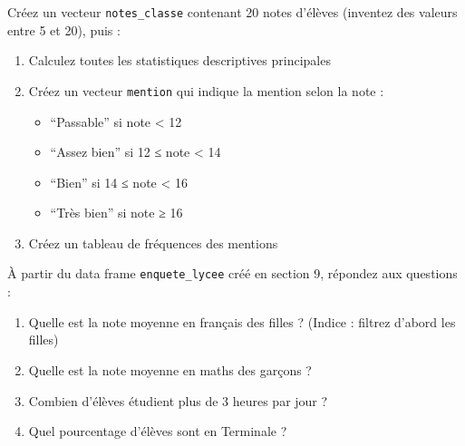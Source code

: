 \documentclass[
  french,
  11pt,
  a4paper,
]{article}
\providecommand{\tightlist}{%
  \setlength{\itemsep}{0pt}\setlength{\parskip}{0pt}}
\begin{document}
\begin{tcolorbox}[enhanced jigsaw, arc=.35mm, bottomrule=.15mm, bottomtitle=1mm, breakable, colback=white, colbacktitle=quarto-callout-caution-color!10!white, colframe=quarto-callout-caution-color-frame, coltitle=black, left=2mm, leftrule=.75mm, opacityback=0, opacitybacktitle=0.6, rightrule=.15mm, title=\textcolor{quarto-callout-caution-color}{\faFire}\hspace{0.5em}{Exercice 12}, titlerule=0mm, toprule=.15mm, toptitle=1mm]

Créez un vecteur \texttt{notes\_classe} contenant 20 notes d'élèves
(inventez des valeurs entre 5 et 20), puis :

\begin{enumerate}
\def\labelenumi{\arabic{enumi}.}
\tightlist
\item
  Calculez toutes les statistiques descriptives principales
\item
  Créez un vecteur \texttt{mention} qui indique la mention selon la note
  :

  \begin{itemize}
  \tightlist
  \item
    ``Passable'' si note \textless{} 12
  \item
    ``Assez bien'' si 12 ≤ note \textless{} 14
  \item
    ``Bien'' si 14 ≤ note \textless{} 16
  \item
    ``Très bien'' si note ≥ 16
  \end{itemize}
\item
  Créez un tableau de fréquences des mentions
\end{enumerate}

\end{tcolorbox}

\begin{tcolorbox}[enhanced jigsaw, arc=.35mm, bottomrule=.15mm, bottomtitle=1mm, breakable, colback=white, colbacktitle=quarto-callout-caution-color!10!white, colframe=quarto-callout-caution-color-frame, coltitle=black, left=2mm, leftrule=.75mm, opacityback=0, opacitybacktitle=0.6, rightrule=.15mm, title=\textcolor{quarto-callout-caution-color}{\faFire}\hspace{0.5em}{Exercice 13}, titlerule=0mm, toprule=.15mm, toptitle=1mm]

À partir du data frame \texttt{enquete\_lycee} créé en section 9,
répondez aux questions :

\begin{enumerate}
\def\labelenumi{\arabic{enumi}.}
\tightlist
\item
  Quelle est la note moyenne en français des filles ? (Indice : filtrez
  d'abord les filles)
\item
  Quelle est la note moyenne en maths des garçons ?
\item
  Combien d'élèves étudient plus de 3 heures par jour ?
\item
  Quel pourcentage d'élèves sont en Terminale ?
\end{enumerate}

\end{tcolorbox}
\end{document}
